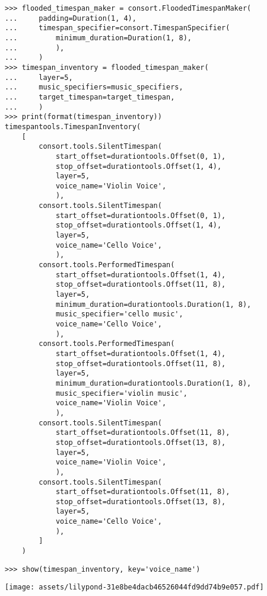 \begin{abjadbookoutput}
\begin{singlespacing}
\vspace{-0.5\baselineskip}
\begin{verbatim}
>>> flooded_timespan_maker = consort.FloodedTimespanMaker(
...     padding=Duration(1, 4),
...     timespan_specifier=consort.TimespanSpecifier(
...         minimum_duration=Duration(1, 8),
...         ),
...     )
>>> timespan_inventory = flooded_timespan_maker(
...     layer=5,
...     music_specifiers=music_specifiers,
...     target_timespan=target_timespan,
...     )
>>> print(format(timespan_inventory))
timespantools.TimespanInventory(
    [
        consort.tools.SilentTimespan(
            start_offset=durationtools.Offset(0, 1),
            stop_offset=durationtools.Offset(1, 4),
            layer=5,
            voice_name='Violin Voice',
            ),
        consort.tools.SilentTimespan(
            start_offset=durationtools.Offset(0, 1),
            stop_offset=durationtools.Offset(1, 4),
            layer=5,
            voice_name='Cello Voice',
            ),
        consort.tools.PerformedTimespan(
            start_offset=durationtools.Offset(1, 4),
            stop_offset=durationtools.Offset(11, 8),
            layer=5,
            minimum_duration=durationtools.Duration(1, 8),
            music_specifier='cello music',
            voice_name='Cello Voice',
            ),
        consort.tools.PerformedTimespan(
            start_offset=durationtools.Offset(1, 4),
            stop_offset=durationtools.Offset(11, 8),
            layer=5,
            minimum_duration=durationtools.Duration(1, 8),
            music_specifier='violin music',
            voice_name='Violin Voice',
            ),
        consort.tools.SilentTimespan(
            start_offset=durationtools.Offset(11, 8),
            stop_offset=durationtools.Offset(13, 8),
            layer=5,
            voice_name='Violin Voice',
            ),
        consort.tools.SilentTimespan(
            start_offset=durationtools.Offset(11, 8),
            stop_offset=durationtools.Offset(13, 8),
            layer=5,
            voice_name='Cello Voice',
            ),
        ]
    )
\end{verbatim}
\begin{verbatim}
>>> show(timespan_inventory, key='voice_name')
\end{verbatim}
\noindent\texttt{[image: assets/lilypond-31e8be4dacb46526044fd9dd74b9e057.pdf]}
\end{singlespacing}
\end{abjadbookoutput}

